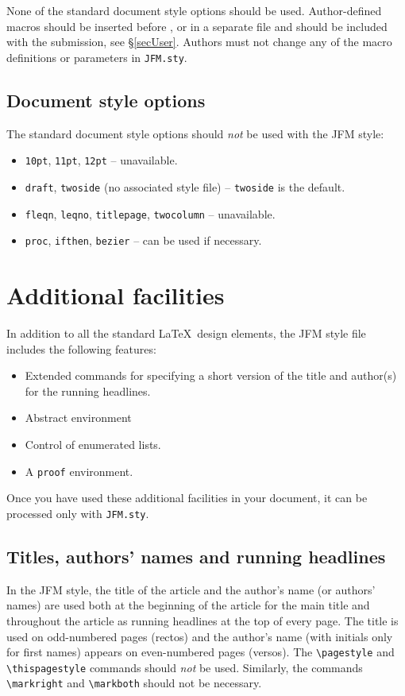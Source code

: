\noindent
None of the standard document style options should be used.
Author-defined macros should be inserted before \verb"",
or in a separate file and should be included with the submission,
see \S\ref{secUser}. Authors must not change any of the macro definitions
or parameters in \verb"JFM.sty".

\subsection{Document style options}

The standard document style options should {\em not\/} be used with
the JFM style:
\begin{itemize}
  \item {\tt 10pt}, {\tt 11pt}, {\tt 12pt} -- unavailable.
  \item {\tt draft}, {\tt twoside} (no associated style file) -- {\tt twoside}
        is the default.
  \item {\tt fleqn}, {\tt leqno}, {\tt titlepage}, {\tt twocolumn} --
        unavailable.
  \item {\tt proc}, {\tt ifthen}, {\tt bezier} -- can be used if necessary.
\end{itemize}

\section{Additional facilities}

In addition to all the standard \LaTeX\ design elements, the JFM style file
includes the following features:
\begin{itemize}
  \item Extended commands for specifying a short version
        of the title and author(s) for the running
        headlines.
  \item Abstract environment
  \item Control of enumerated lists.
  \item A \verb"proof" environment.
\end{itemize}
Once you have used these additional facilities in your document,
it can be processed only with \verb"JFM.sty".

\subsection{Titles, authors' names and running headlines}

In the JFM style, the title of the article and the author's name (or authors'
names) are used both at the beginning of the article for the main title and
throughout the article as running headlines at the top of every page.
The title is used on odd-numbered pages (rectos) and the author's name
(with initials only for first names) appears on even-numbered pages
(versos). The \verb"\pagestyle" and \verb"\thispagestyle" commands should
{\em not\/} be used.  Similarly, the commands \verb"\markright" and
\verb"\markboth" should not be necessary.

